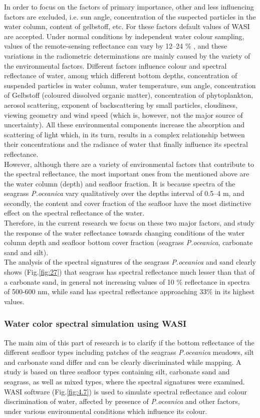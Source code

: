 \documentclass[10pt, a4paper]{article}
\begin{document}
In order to focus on the factors of primary importance, other and less influencing factors are excluded,
i.e. sun angle, concentration of the suspected particles in the water column, content of gelbstoff, etc.
For these factors default values of WASI are accepted.
Under normal conditions by independent water colour sampling, values of the remote-sensing
reflectance can vary by 12–24 \% \cite{Toole00}\label{Toole00}, and these variations in the radiometric
determinations are mainly caused by the variety of the environmental factors.
Different factors influence colour and spectral reflectance of water, among which different bottom
depths, concentration of suspended particles in water column, water temperature, sun angle,
concentration of Gelbstoff (coloured dissolved organic matter), concentration of phytoplankton,
aerosol scattering, exponent of backscattering by small particles, cloudiness, viewing geometry and
wind speed (which is, however, not the major source of uncertainty). All these environmental
components increase the absorption and scattering of light which, in its turn, results in a complex
relationship between their concentrations and the radiance of water that finally influence its spectral
reflectance.\\
However, although there are a variety of environmental factors that contribute to the spectral
reflectance, the most important ones from the mentioned above are the water column (depth) and seafloor fraction.
It is because spectra of the seagrass \textit{P.oceanica} vary qualitatively over the depths interval of 0.5–4 m,
and secondly, the content and cover fraction of the seafloor have the most distinctive effect on the
spectral reflectance of the water. \\
Therefore, in the current research we focus on these two major factors, and study the response of the
water reflectance towards changing conditions of the water column depth and seafloor bottom cover
fraction (seagrass \textit{P.oceanica}, carbonate sand and silt).\\
The analysis of the spectral signatures of the seagrass \textit{P.oceanica} and sand clearly shows (Fig.\ref{fig:27}) that seagrass
has spectral reflectance much lesser than that of a carbonate sand, in general not increasing values of
10 \% reflectance in spectra of 500-600 nm, while sand has spectral reflectance approaching 33\% in its
highest values.

\subsubsection{Water color spectral simulation using WASI}
The main aim of this part of research is to clarify if the bottom reflectance of the different seafloor types including patches of
the seagrass \textit{P.oceanica} meadows, silt and carbonate sand differ and can be clearly discriminated while mapping. A study is
based on three seafloor types containing silt, carbonate sand and seagrass, as well as mixed
types, where the spectral signatures were examined. WASI software (Fig.\ref{fig:4.7}) is used to simulate
spectral reflectance and colour discrimination of water, affected by presence of \textit{P.oceanica} and other factors, under various
environmental conditions which influence its colour.
\end{document}
